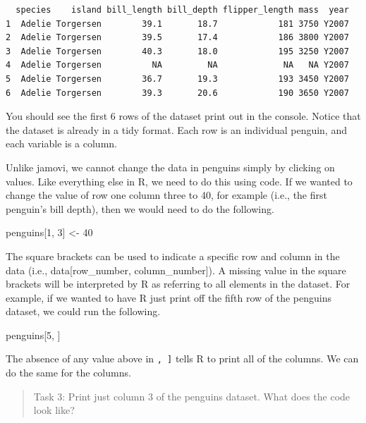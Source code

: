 \documentclass[
]{scrbook}
\newenvironment{Shaded}{\begin{snugshade}}{\end{snugshade}}
\newcommand{\DecValTok}[1]{\textcolor[rgb]{0.00,0.00,0.81}{#1}}
\newcommand{\NormalTok}[1]{#1}
\newcommand{\OtherTok}[1]{\textcolor[rgb]{0.56,0.35,0.01}{#1}}
\begin{document}
\begin{verbatim}
  species    island bill_length bill_depth flipper_length mass  year
1  Adelie Torgersen        39.1       18.7            181 3750 Y2007
2  Adelie Torgersen        39.5       17.4            186 3800 Y2007
3  Adelie Torgersen        40.3       18.0            195 3250 Y2007
4  Adelie Torgersen          NA         NA             NA   NA Y2007
5  Adelie Torgersen        36.7       19.3            193 3450 Y2007
6  Adelie Torgersen        39.3       20.6            190 3650 Y2007
\end{verbatim}

You should see the first 6 rows of the dataset print out in the console.
Notice that the dataset is already in a tidy format.
Each row is an individual penguin, and each variable is a column.

Unlike jamovi, we cannot change the data in penguins simply by clicking on values.
Like everything else in R, we need to do this using code.
If we wanted to change the value of row one column three to 40, for example (i.e., the first penguin's bill depth), then we would need to do the following.

\begin{Shaded}
\begin{Highlighting}[]
\NormalTok{penguins[}\DecValTok{1}\NormalTok{, }\DecValTok{3}\NormalTok{] }\OtherTok{\textless{}{-}} \DecValTok{40}
\end{Highlighting}
\end{Shaded}

The square brackets can be used to indicate a specific row and column in the data (i.e., data{[}row\_number, column\_number{]}).
A missing value in the square brackets will be interpreted by R as referring to all elements in the dataset.
For example, if we wanted to have R just print off the fifth row of the penguins dataset, we could run the following.

\begin{Shaded}
\begin{Highlighting}[]
\NormalTok{penguins[}\DecValTok{5}\NormalTok{, ]}
\end{Highlighting}
\end{Shaded}

The absence of any value above in \texttt{,\ {]}} tells R to print all of the columns. We can do the same for the columns.

\begin{quote}
Task 3: Print just column 3 of the penguins dataset. What does the code look like?
\end{quote}
\end{document}
